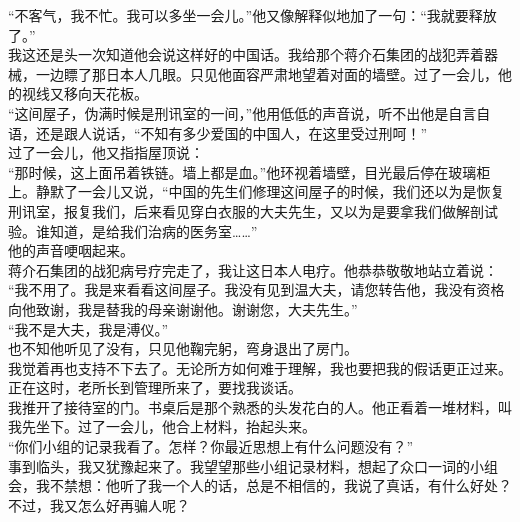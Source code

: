“不客气，我不忙。我可以多坐一会儿。”他又像解释似地加了一句：“我就要释放了。”\\

我这还是头一次知道他会说这样好的中国话。我给那个蒋介石集团的战犯弄着器械，一边瞟了那日本人几眼。只见他面容严肃地望着对面的墙壁。过了一会儿，他的视线又移向天花板。\\

“这间屋子，伪满时候是刑讯室的一间，”他用低低的声音说，听不出他是自言自语，还是跟人说话，“不知有多少爱国的中国人，在这里受过刑呵！”\\

过了一会儿，他又指指屋顶说：\\

“那时候，这上面吊着铁链。墙上都是血。”他环视着墙壁，目光最后停在玻璃柜上。静默了一会儿又说，“中国的先生们修理这间屋子的时候，我们还以为是恢复刑讯室，报复我们，后来看见穿白衣服的大夫先生，又以为是要拿我们做解剖试验。谁知道，是给我们治病的医务室……”\\

他的声音哽咽起来。\\

蒋介石集团的战犯病号疗完走了，我让这日本人电疗。他恭恭敬敬地站立着说：\\

“我不用了。我是来看看这间屋子。我没有见到温大夫，请您转告他，我没有资格向他致谢，我是替我的母亲谢谢他。谢谢您，大夫先生。”\\

“我不是大夫，我是溥仪。”\\

也不知他听见了没有，只见他鞠完躬，弯身退出了房门。\\

我觉着再也支持不下去了。无论所方如何难于理解，我也要把我的假话更正过来。\\

正在这时，老所长到管理所来了，要找我谈话。\\

我推开了接待室的门。书桌后是那个熟悉的头发花白的人。他正看着一堆材料，叫我先坐下。过了一会儿，他合上材料，抬起头来。\\

“你们小组的记录我看了。怎样？你最近思想上有什么问题没有？”\\

事到临头，我又犹豫起来了。我望望那些小组记录材料，想起了众口一词的小组会，我不禁想：他听了我一个人的话，总是不相信的，我说了真话，有什么好处？不过，我又怎么好再骗人呢？\\

